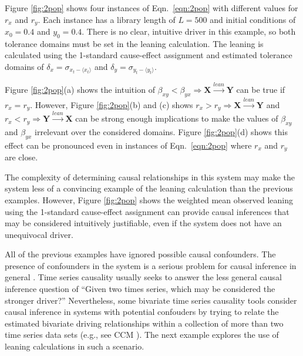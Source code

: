 \documentclass[twocolumn,aps,pre,groupedaddress]{revtex4-1}
\begin{document}
Figure \ref{fig:2pop} shows four instances of Eqn.\ \ref{eqn:2pop} with different values for $r_x$ and $r_y$.  Each instance has a library length of $L=500$ and initial conditions of $x_0 = 0.4$ and $y_0 = 0.4$.  There is no clear, intuitive driver in this example, so both tolerance domains must be set in the leaning calculation.  The leaning is calculated using the 1-standard cause-effect assignment and estimated tolerance domains of $\delta_x = \sigma_{x_t-\langle x_t \rangle}$ and $\delta_y = \sigma_{y_t-\langle y_t \rangle}$.

Figure \ref{fig:2pop}(a) shows the intuition of $\beta_{xy}<\beta_{yx}\Rightarrow\mathbf{X}\xrightarrow{lean}\mathbf{Y}$ can be true if $r_x=r_y$.  However, Figure \ref{fig:2pop}(b) and (c) shows $r_x>r_y\Rightarrow\mathbf{X}\xrightarrow{lean}\mathbf{Y}$ and $r_x<r_y\Rightarrow\mathbf{Y}\xrightarrow{lean}\mathbf{X}$ can be strong enough implications to make the values of $\beta_{xy}$ and $\beta_{yx}$ irrelevant over the considered domains.  Figure \ref{fig:2pop}(d) shows this effect can be pronounced even in instances of Eqn.\ \ref{eqn:2pop} where $r_x$ and $r_y$ are close.  

The complexity of determining causal relationships in this system may make the system less of a convincing example of the leaning calculation than the previous examples.  However, Figure \ref{fig:2pop} shows the weighted mean observed leaning using the 1-standard cause-effect assignment can provide causal inferences that may be considered intuitively justifiable, even if the system does not have an unequivocal driver. 

All of the previous examples have ignored possible causal confounders.  The presence of confounders in the system is a serious problem for causal inference in general \cite{Rubin2015,Pearl2000}.  Time series causality usually seeks to answer the less general causal inference question of ``Given two times series, which may be considered the stronger driver?'' Nevertheless, some bivariate time series causality tools consider causal inference in systems with potential confouders by trying to relate the estimated bivariate driving relationships within a collection of more than two time series data sets (e.g., see CCM \cite{Sugihara2012}).  The next example explores the use of leaning calculations in such a scenario.
\end{document}
